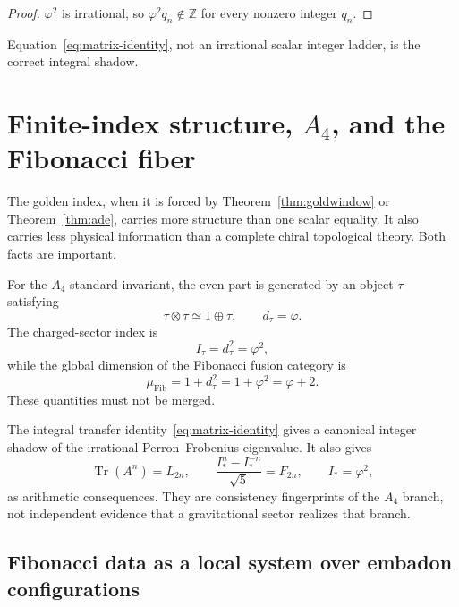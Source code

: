 \documentclass[aps,prd,preprint,nofootinbib,superscriptaddress]{revtex4-2}
\theoremstyle{definition}
\theoremstyle{remark}
\newcommand{\Tr}{\operatorname{Tr}}
\newcommand{\Fib}{\mathrm{Fib}}
\begin{document}
\begin{proof}
$\varphi^2$ is irrational, so $\varphi^2q_n\notin\mathbb Z$ for every nonzero integer $q_n$.
\end{proof}

Equation~\eqref{eq:matrix-identity}, not an irrational scalar integer ladder, is the correct integral shadow.




\section{Finite-index structure, $A_4$, and the Fibonacci fiber}
\label{sec:fib}

The golden index, when it is forced by Theorem~\ref{thm:goldwindow} or
Theorem~\ref{thm:ade}, carries more structure than one scalar equality.  It
also carries less physical information than a complete chiral topological
theory.  Both facts are important.

For the $A_4$ standard invariant, the even part is generated by an object
$\tau$ satisfying
\begin{equation}
\tau\otimes\tau\simeq 1\oplus\tau,
\qquad
d_\tau=\varphi.
\label{eq:fibfusionmain}
\end{equation}
The charged-sector index is
\begin{equation}
I_\tau=d_\tau^2=\varphi^2,
\end{equation}
while the global dimension of the Fibonacci fusion category is
\begin{equation}
\mu_{\Fib}
=
1+d_\tau^2
=
1+\varphi^2
=
\varphi+2.
\label{eq:fibglobaldim}
\end{equation}
These quantities must not be merged.

The integral transfer identity~\eqref{eq:matrix-identity} gives a canonical
integer shadow of the irrational Perron--Frobenius eigenvalue.  It also gives
\begin{equation}
\Tr(A^n)=L_{2n},
\qquad
\frac{I_*^n-I_*^{-n}}{\sqrt5}=F_{2n},
\qquad
I_*=\varphi^2,
\label{eq:fiblucas}
\end{equation}
as arithmetic consequences.  They are consistency fingerprints of the
$A_4$ branch, not independent evidence that a gravitational sector realizes
that branch.

\subsection{Fibonacci data as a local system over embadon configurations}
\end{document}
